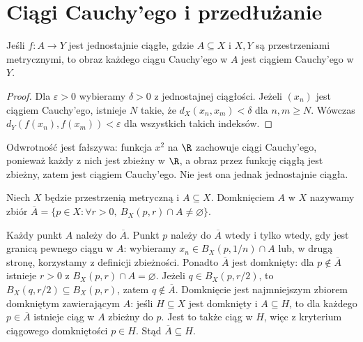 \section{Ciągi Cauchy'ego i przedłużanie}
\begin{twierdzenie}
\label{ma1:thm:uniform-preserves-cauchy}
Jeśli $f:A\to Y$ jest jednostajnie ciągłe, gdzie $A\subseteq X$ i $X,Y$ są przestrzeniami metrycznymi, to obraz każdego ciągu Cauchy'ego w $A$ jest ciągiem Cauchy'ego w $Y$.
\end{twierdzenie}
\begin{proof}
Dla $\varepsilon>0$ wybieramy $\delta>0$ z jednostajnej ciągłości. Jeżeli $(x_n)$ jest ciągiem Cauchy'ego, istnieje $N$ takie, że $d_X(x_n,x_m)<\delta$ dla $n,m\ge N$. Wówczas $d_Y(f(x_n),f(x_m))<\varepsilon$ dla wszystkich takich indeksów.
\end{proof}
Odwrotność jest fałszywa: funkcja $x^2$ na $\R$ zachowuje ciągi Cauchy'ego, ponieważ każdy z nich jest zbieżny w $\R$, a obraz przez funkcję ciągłą jest zbieżny, zatem jest ciągiem Cauchy'ego. Nie jest ona jednak jednostajnie ciągła.

\begin{definicja}
\label{ma1:def:metric-closure}
Niech $X$ będzie przestrzenią metryczną i $A\subseteq X$. Domknięciem $A$ w $X$ nazywamy zbiór
$\overline A=\{p\in X:\forall r>0,\ B_X(p,r)\cap A\ne\varnothing\}$.
\end{definicja}
Każdy punkt $A$ należy do $\overline A$. Punkt $p$ należy do $\overline A$ wtedy i tylko wtedy, gdy jest granicą pewnego ciągu w $A$: wybieramy $x_n\in B_X(p,1/n)\cap A$ lub, w drugą stronę, korzystamy z definicji zbieżności. Ponadto $\overline A$ jest domknięty: dla $p\notin\overline A$ istnieje $r>0$ z $B_X(p,r)\cap A=\varnothing$. Jeżeli $q\in B_X(p,r/2)$, to $B_X(q,r/2)\subseteq B_X(p,r)$, zatem $q\notin\overline A$. Domknięcie jest najmniejszym zbiorem domkniętym zawierającym $A$: jeśli $H\subseteq X$ jest domknięty i $A\subseteq H$, to dla każdego $p\in\overline A$ istnieje ciąg w $A$ zbieżny do $p$. Jest to także ciąg w $H$, więc z kryterium ciągowego domkniętości $p\in H$. Stąd $\overline A\subseteq H$.

